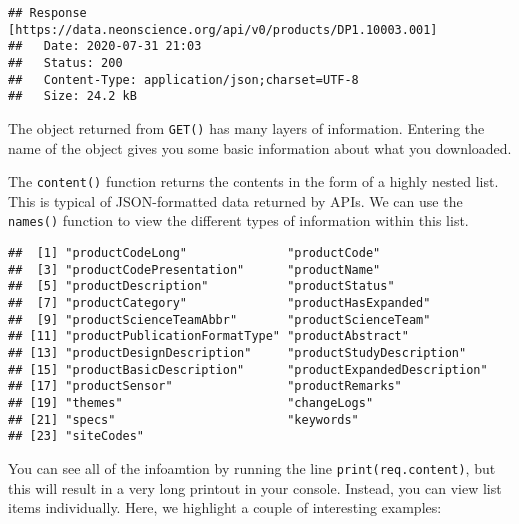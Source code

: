 \documentclass[]{book}
\newenvironment{Shaded}{\begin{snugshade}}{\end{snugshade}}
\newcommand{\CommentTok}[1]{\textcolor[rgb]{0.56,0.35,0.01}{\textit{#1}}}
\newcommand{\DataTypeTok}[1]{\textcolor[rgb]{0.13,0.29,0.53}{#1}}
\newcommand{\KeywordTok}[1]{\textcolor[rgb]{0.13,0.29,0.53}{\textbf{#1}}}
\newcommand{\NormalTok}[1]{#1}
\newcommand{\OperatorTok}[1]{\textcolor[rgb]{0.81,0.36,0.00}{\textbf{#1}}}
\newcommand{\StringTok}[1]{\textcolor[rgb]{0.31,0.60,0.02}{#1}}
\begin{document}
\begin{verbatim}
## Response [https://data.neonscience.org/api/v0/products/DP1.10003.001]
##   Date: 2020-07-31 21:03
##   Status: 200
##   Content-Type: application/json;charset=UTF-8
##   Size: 24.2 kB
\end{verbatim}

The object returned from \texttt{GET()} has many layers of information. Entering the
name of the object gives you some basic information about what you downloaded.

The \texttt{content()} function returns the contents in the form of a highly nested
list. This is typical of JSON-formatted data returned by APIs. We can use the
\texttt{names()} function to view the different types of information within this list.

\begin{Shaded}
\end{Shaded}

\begin{verbatim}
##  [1] "productCodeLong"              "productCode"                 
##  [3] "productCodePresentation"      "productName"                 
##  [5] "productDescription"           "productStatus"               
##  [7] "productCategory"              "productHasExpanded"          
##  [9] "productScienceTeamAbbr"       "productScienceTeam"          
## [11] "productPublicationFormatType" "productAbstract"             
## [13] "productDesignDescription"     "productStudyDescription"     
## [15] "productBasicDescription"      "productExpandedDescription"  
## [17] "productSensor"                "productRemarks"              
## [19] "themes"                       "changeLogs"                  
## [21] "specs"                        "keywords"                    
## [23] "siteCodes"
\end{verbatim}

You can see all of the infoamtion by running the line \texttt{print(req.content)}, but
this will result in a very long printout in your console. Instead, you can view
list items individually. Here, we highlight a couple of interesting examples:

\begin{Shaded}
\end{Shaded}
\end{document}
